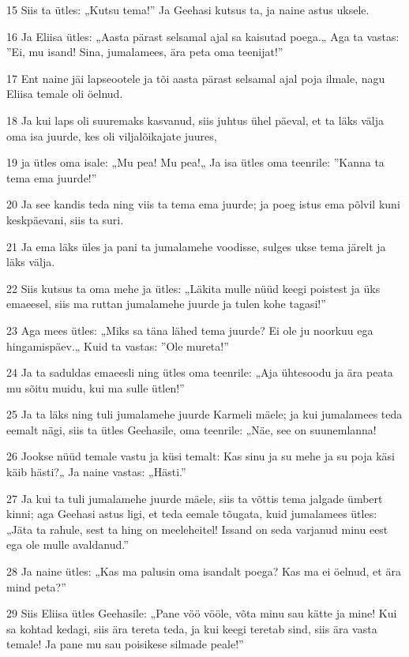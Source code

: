\par 15 Siis ta ütles: „Kutsu tema!” Ja Geehasi kutsus ta, ja naine astus uksele.
\par 16 Ja Eliisa ütles: „Aasta pärast selsamal ajal sa kaisutad poega.„ Aga ta vastas: ”Ei, mu isand! Sina, jumalamees, ära peta oma teenijat!”
\par 17 Ent naine jäi lapseootele ja tõi aasta pärast selsamal ajal poja ilmale, nagu Eliisa temale oli öelnud.
\par 18 Ja kui laps oli suuremaks kasvanud, siis juhtus ühel päeval, et ta läks välja oma isa juurde, kes oli viljalõikajate juures,
\par 19 ja ütles oma isale: „Mu pea! Mu pea!„ Ja isa ütles oma teenrile: ”Kanna ta tema ema juurde!”
\par 20 Ja see kandis teda ning viis ta tema ema juurde; ja poeg istus ema põlvil kuni keskpäevani, siis ta suri.
\par 21 Ja ema läks üles ja pani ta jumalamehe voodisse, sulges ukse tema järelt ja läks välja.
\par 22 Siis kutsus ta oma mehe ja ütles: „Läkita mulle nüüd keegi poistest ja üks emaeesel, siis ma ruttan jumalamehe juurde ja tulen kohe tagasi!”
\par 23 Aga mees ütles: „Miks sa täna lähed tema juurde? Ei ole ju noorkuu ega hingamispäev.„ Kuid ta vastas: ”Ole mureta!”
\par 24 Ja ta saduldas emaeesli ning ütles oma teenrile: „Aja ühtesoodu ja ära peata mu sõitu muidu, kui ma sulle ütlen!”
\par 25 Ja ta läks ning tuli jumalamehe juurde Karmeli mäele; ja kui jumalamees teda eemalt nägi, siis ta ütles Geehasile, oma teenrile: „Näe, see on suunemlanna!
\par 26 Jookse nüüd temale vastu ja küsi temalt: Kas sinu ja su mehe ja su poja käsi käib hästi?„ Ja naine vastas: „Hästi.”
\par 27 Ja kui ta tuli jumalamehe juurde mäele, siis ta võttis tema jalgade ümbert kinni; aga Geehasi astus ligi, et teda eemale tõugata, kuid jumalamees ütles: „Jäta ta rahule, sest ta hing on meeleheitel! Issand on seda varjanud minu eest ega ole mulle avaldanud.”
\par 28 Ja naine ütles: „Kas ma palusin oma isandalt poega? Kas ma ei öelnud, et ära mind peta?”
\par 29 Siis Eliisa ütles Geehasile: „Pane vöö vööle, võta minu sau kätte ja mine! Kui sa kohtad kedagi, siis ära tereta teda, ja kui keegi teretab sind, siis ära vasta temale! Ja pane mu sau poisikese silmade peale!”
